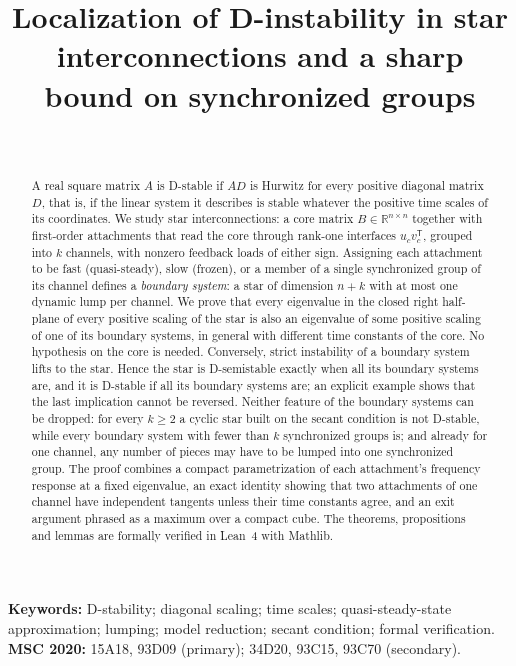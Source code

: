 \documentclass[11pt,a4paper]{article}
\title{Localization of D-instability in star interconnections and a sharp bound on synchronized groups}
\author{\PaperAuthor\\[2pt]\small\PaperAffiliation}
\date{\PaperDate}
\theoremstyle{plain}
\theoremstyle{definition}
\theoremstyle{remark}
\newcommand{\R}{\mathbb{R}}
\newcommand{\T}{\mathsf{T}}
\begin{document}
\maketitle

\begin{abstract}
A real square matrix $A$ is D-stable if $AD$ is Hurwitz for every positive diagonal
matrix $D$, that is, if the linear system it describes is stable whatever the positive
time scales of its coordinates. We study star interconnections: a core matrix
$B\in\R^{n\times n}$ together with first-order attachments that read the core through
rank-one interfaces $u_cv_c^\T$, grouped into $k$ channels, with nonzero feedback loads of
either sign. Assigning each attachment to be fast (quasi-steady), slow (frozen), or a member
of a single synchronized group of its channel defines a \emph{boundary system}: a star of
dimension $n+k$ with at most one dynamic lump per channel. We prove that every eigenvalue in
the closed right half-plane of every positive scaling of the star is also an eigenvalue of
some positive scaling of one of its boundary systems, in general with different time
constants of the core. No hypothesis on the core is needed.
Conversely, strict instability of a boundary system lifts to the star. Hence the star is
D-semistable exactly when all its boundary systems are, and it is D-stable if all its
boundary systems are; an explicit example shows that the last implication cannot be
reversed. Neither feature of the boundary systems can be dropped: for every $k\ge2$ a cyclic
star built on the secant condition is not D-stable, while every boundary system with fewer
than $k$ synchronized groups is; and already for one channel, any number of pieces may have
to be lumped into one synchronized group. The proof combines a compact parametrization of each
attachment's frequency response at a fixed eigenvalue, an exact identity showing that two
attachments of one channel have independent tangents unless their time constants agree, and
an exit argument phrased as a maximum over a compact cube. The theorems, propositions and
lemmas are formally verified in Lean~4 with Mathlib.
\end{abstract}

\noindent\textbf{Keywords:} D-stability; diagonal scaling; time scales;
quasi-steady-state approximation; lumping; model reduction; secant condition; formal
verification.\\[2pt]
\textbf{MSC 2020:} 15A18, 93D09 (primary); 34D20, 93C15, 93C70 (secondary).

\tableofcontents
\end{document}
